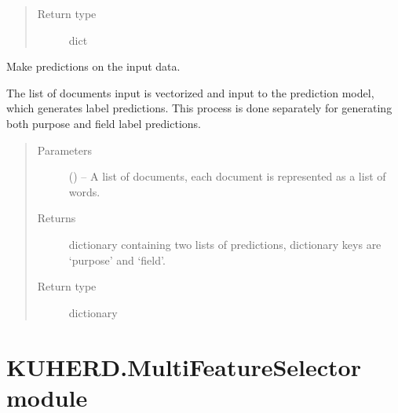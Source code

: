 \documentclass[letterpaper,10pt,english]{sphinxmanual}
\begin{document}
\begin{fulllineitems}
\begin{fulllineitems}
\begin{quote}
\begin{description}
\item[{Return type}] \leavevmode
dict

\end{description}\end{quote}

\end{fulllineitems}


\begin{fulllineitems}
\label{\detokenize{KUHERD:KUHERD.Models.PurposeFieldModel.predict}}
Make predictions on the input data.

The list of documents input is vectorized and input to the prediction model, which generates label predictions.
This process is done separately for generating both purpose and field label predictions.
\begin{quote}\begin{description}
\item[{Parameters}] \leavevmode
{} () -- A list of documents, each document is represented as a list of words.

\item[{Returns}] \leavevmode
dictionary containing two lists of predictions, dictionary keys are `purpose' and `field'.

\item[{Return type}] \leavevmode
dictionary

\end{description}\end{quote}

\end{fulllineitems}


\end{fulllineitems}



\section{KUHERD.MultiFeatureSelector module}
\label{\detokenize{KUHERD:kuherd-multifeatureselector-module}}\label{\detokenize{KUHERD:module-KUHERD.MultiFeatureSelector}}
\end{document}
